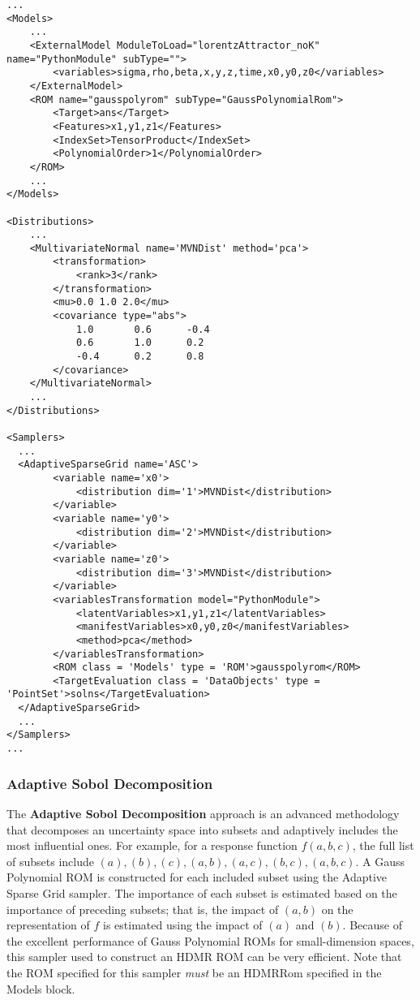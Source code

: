 

\begin{lstlisting}[style=XML,morekeywords={ND,grid}]
...
<Models>
    ...
    <ExternalModel ModuleToLoad="lorentzAttractor_noK" name="PythonModule" subType="">
        <variables>sigma,rho,beta,x,y,z,time,x0,y0,z0</variables>
    </ExternalModel>
    <ROM name="gausspolyrom" subType="GaussPolynomialRom">
        <Target>ans</Target>
        <Features>x1,y1,z1</Features>
        <IndexSet>TensorProduct</IndexSet>
        <PolynomialOrder>1</PolynomialOrder>
    </ROM>
    ...
</Models>

<Distributions>
    ...
    <MultivariateNormal name='MVNDist' method='pca'>
        <transformation>
            <rank>3</rank>
        </transformation>
        <mu>0.0 1.0 2.0</mu>
        <covariance type="abs">
            1.0       0.6      -0.4
            0.6       1.0      0.2
            -0.4      0.2      0.8
        </covariance>
    </MultivariateNormal>
    ...
</Distributions>

<Samplers>
  ...
  <AdaptiveSparseGrid name='ASC'>
        <variable name='x0'>
            <distribution dim='1'>MVNDist</distribution>
        </variable>
        <variable name='y0'>
            <distribution dim='2'>MVNDist</distribution>
        </variable>
        <variable name='z0'>
            <distribution dim='3'>MVNDist</distribution>
        </variable>
        <variablesTransformation model="PythonModule">
            <latentVariables>x1,y1,z1</latentVariables>
            <manifestVariables>x0,y0,z0</manifestVariables>
            <method>pca</method>
        </variablesTransformation>
        <ROM class = 'Models' type = 'ROM'>gausspolyrom</ROM>
        <TargetEvaluation class = 'DataObjects' type = 'PointSet'>solns</TargetEvaluation>
  </AdaptiveSparseGrid>
  ...
</Samplers>
...
\end{lstlisting}

\subsubsection{Adaptive Sobol Decomposition}
\label{subsubsubsec:AdaptiveSobol}
The \textbf{Adaptive Sobol Decomposition} approach is an advanced methodology that decomposes an uncertainty
space into subsets and adaptively includes the most influential ones.  For example, for a response function
$f(a,b,c)$, the full list of subsets include $(a), (b), (c), (a,b), (a,c), (b,c), (a,b,c)$.  A Gauss Polynomial ROM is
constructed for each included subset using the Adaptive Sparse Grid sampler.  The importance of each subset is
estimated based on the importance of preceding subsets; that is, the impact of $(a,b)$ on the representation
of $f$ is estimated using the impact of $(a)$ and $(b)$.  Because of the excellent performance of Gauss
Polynomial ROMs for small-dimension spaces, this sampler used to construct an HDMR ROM can be very efficient.
Note that the ROM specified for this sampler \emph{must} be an HDMRRom specified in the Models block.
%

